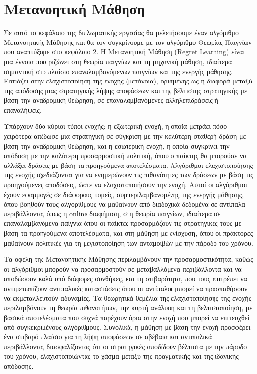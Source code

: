\chapter{Μετανοητική Μάθηση}

Σε αυτό το κεφάλαιο της διπλωματικής εργασίας θα μελετήσουμε έναν αλγόριθμο Μετανοητικής Μάθησης και θα τον συγκρίνουμε με τον αλγόριθμο Θεωρίας Παιγνίων που αναπτύξαμε στο κεφάλαιο 2. Η Μετανοητική Μάθηση (Regret Learning) είναι μια έννοια που ριζώνει στη θεωρία παιγνίων και τη μηχανική μάθηση, ιδιαίτερα σημαντική στο πλαίσιο επαναλαμβανόμενων παιγνίων και της ενεργής μάθησης. Εστιάζει στην ελαχιστοποίηση της ενοχής (μετάνοια), ορισμένης ως η διαφορά μεταξύ της απόδοσης μιας στρατηγικής λήψης αποφάσεων και της βέλτιστης στρατηγικής με βάση την αναδρομική θεώρηση, σε επαναλαμβανόμενες αλληλεπιδράσεις ή επαναλήψεις. 

Υπάρχουν δύο κύριοι τύποι ενοχής: η εξωτερική ενοχή, η οποία μετράει πόσο χειρότερα απέδωσε μια στρατηγική σε σύγκριση με την καλύτερη σταθερή δράση με βάση την αναδρομική θεώρηση, και η εσωτερική ενοχή, η οποία συγκρίνει την απόδοση με την καλύτερη προσαρμοστική πολιτική, όπου ο παίκτης θα μπορούσε να αλλάξει δράσεις με βάση τα προηγούμενα αποτελέσματα. Αλγόριθμοι ελαχιστοποίησης της ενοχής σχεδιάζονται για να ενημερώνουν τις πιθανότητες των δράσεων με βάση τις προηγούμενες αποδόσεις, ώστε να ελαχιστοποιήσουν την ενοχή. Αυτοί οι αλγόριθμοι έχουν εφαρμογές σε διάφορους τομείς, συμπεριλαμβανομένης της ενεργής μάθησης, όπου βοηθούν τους αλγορίθμους να μαθαίνουν από διαδοχικά δεδομένα σε αντίπαλα περιβάλλοντα, όπως η online διαφήμιση, στη θεωρία παιγνίων, ιδιαίτερα σε επαναλαμβανόμενα παίγνια όπου οι παίκτες προσαρμόζουν τις στρατηγικές τους με βάση τα προηγούμενα αποτελέσματα, και στη μάθηση με ενίσχυση, όπου οι πράκτορες μαθαίνουν πολιτικές για τη μεγιστοποίηση των ανταμοιβών με την πάροδο του χρόνου.

Τα οφέλη της Μετανοητικής Μάθησης περιλαμβάνουν την προσαρμοστικότητα, καθώς οι αλγόριθμοι μπορούν να προσαρμοστούν σε μεταβαλλόμενα περιβάλλοντα και να αποδώσουν καλά υπό διάφορες συνθήκες, και τη στιβαρότητα, που τους επιτρέπει να αντιμετωπίζουν αντιπαλικές καταστάσεις όπου οι αντίπαλοι μπορεί να προσπαθήσουν να εκμεταλλευτούν αδυναμίες. Τα θεωρητικά θεμέλια της ελαχιστοποίησης της ενοχής περιλαμβάνουν τη θεωρία πιθανοτήτων, την κυρτή ανάλυση και τη βελτιστοποίηση, με βασικά αποτελέσματα που συχνά παρέχουν όρια στην ενοχή που μπορεί να επιτευχθεί από συγκεκριμένους αλγόριθμους. Συνολικά, η μάθηση με βάση την ενοχή προσφέρει ένα στιβαρό πλαίσιο για τη λήψη αποφάσεων σε αβέβαια και αντιπαλικά περιβάλλοντα, διασφαλίζοντας ότι οι στρατηγικές αποδίδουν βέλτιστα με την πάροδο του χρόνου, ελαχιστοποιώντας το χάσμα μεταξύ της πραγματικής και της ιδανικής απόδοσης.

